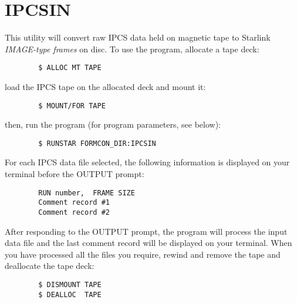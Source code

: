 \section {IPCSIN}
This utility will convert raw IPCS data held on magnetic tape to Starlink
{\em IMAGE-type frames} on disc.
To use the program, allocate a tape deck:
\begin{verbatim}
        $ ALLOC MT TAPE
\end{verbatim}
load the IPCS tape on the allocated deck and mount it:
\begin{verbatim}
        $ MOUNT/FOR TAPE
\end{verbatim}
then, run the program (for program parameters, see below):
\begin{verbatim}
        $ RUNSTAR FORMCON_DIR:IPCSIN
\end{verbatim}
For each IPCS data file selected, the following information is displayed on
your terminal before the OUTPUT prompt:
\begin{verbatim}
        RUN number,  FRAME SIZE
        Comment record #1
        Comment record #2
\end{verbatim}
After responding to the OUTPUT prompt, the program will process the input data
file and the last comment record will be displayed on your terminal.
When you have processed all the files you require, rewind and remove the tape
and deallocate the tape deck:
\begin{verbatim}
        $ DISMOUNT TAPE
        $ DEALLOC  TAPE
\end{verbatim}
